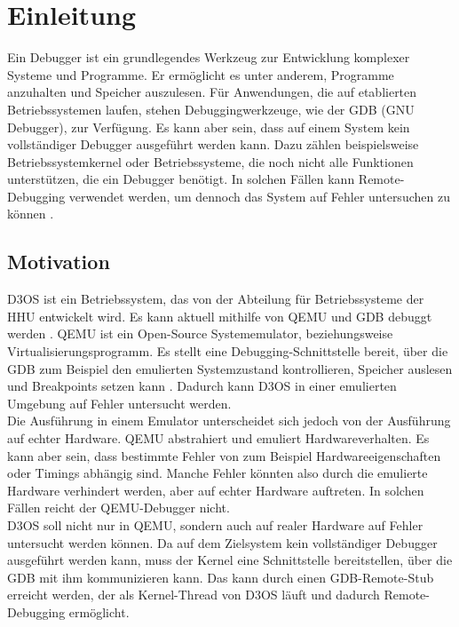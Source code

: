 \chapter{Einleitung}
Ein Debugger ist ein grundlegendes Werkzeug zur Entwicklung komplexer Systeme und Programme. Er ermöglicht es unter anderem, Programme anzuhalten und Speicher auszulesen. Für Anwendungen, die auf etablierten Betriebssystemen laufen, stehen Debuggingwerkzeuge, wie der GDB (GNU Debugger), zur Verfügung. Es kann aber sein, dass auf einem System kein vollständiger Debugger ausgeführt werden kann. Dazu zählen beispielsweise Betriebssystemkernel oder Betriebssysteme, die noch nicht alle Funktionen unterstützen, die ein Debugger benötigt. In solchen Fällen kann Remote-Debugging verwendet werden, um dennoch das System auf Fehler untersuchen zu können \cite{gdb}.

\section{Motivation}
D3OS ist ein Betriebssystem, das von der Abteilung für Betriebssysteme der HHU entwickelt wird. Es kann aktuell mithilfe von QEMU und GDB debuggt werden \cite{d3os-repo}. QEMU ist ein Open-Source Systememulator, beziehungsweise Virtualisierungsprogramm. Es stellt eine Debugging-Schnittstelle bereit, über die GDB zum Beispiel den emulierten Systemzustand kontrollieren, Speicher auslesen und Breakpoints setzen kann \cite{qemu}. Dadurch kann D3OS in einer emulierten Umgebung auf Fehler untersucht werden.\\
Die Ausführung in einem Emulator unterscheidet sich jedoch von der Ausführung auf echter Hardware. QEMU abstrahiert und emuliert Hardwareverhalten. Es kann aber sein, dass bestimmte Fehler von zum Beispiel Hardwareeigenschaften oder Timings abhängig sind. Manche Fehler könnten also durch die emulierte Hardware verhindert werden, aber auf echter Hardware auftreten. In solchen Fällen reicht der QEMU-Debugger nicht.\\
D3OS soll nicht nur in QEMU, sondern auch auf realer Hardware auf Fehler untersucht werden können. Da auf dem Zielsystem kein vollständiger Debugger ausgeführt werden kann, muss der Kernel eine Schnittstelle bereitstellen, über die GDB mit ihm kommunizieren kann. Das kann durch einen GDB-Remote-Stub erreicht werden, der als Kernel-Thread von D3OS läuft und dadurch Remote-Debugging ermöglicht.

